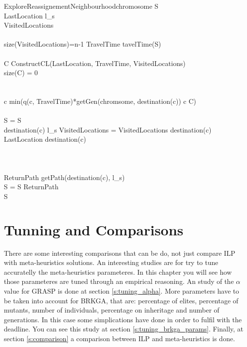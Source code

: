 \documentclass[]{report}
\begin{document}
\begin{pseudocode}{ExploreReassignementNeighbourhood}{chromosome}
	\label{pc:brkga_decoder}
	S \GETS \varnothing\\
	LastLocation \GETS l_{s}\\
	VisitedLocations \GETS \varnothing\\
	\\
	\WHILE \NOT size(VisitedLocations)=n-1 \DO
	\BEGIN
	TravelTime \GETS tavelTime(S)\\
	\\
	C \GETS ConstructCL(LastLocation, TravelTime, VisitedLocations)\\
	\IF size(C) = 0 \THEN
	\\
	\\
	\\
	c \GETS min(q(c, TravelTime)*getGen(chromsome, destination(c)) \quad \forall c \in C)\\
	\\
	S = S \\
	\IF destination(c) \neq l_{s} \THEN
	VisitedLocations = VisitedLocations \cup destination(c)\\
	LastLocation \GETS destination(c)\\
	\END\\
	\\
	\\
	ReturnPath \GETS getPath(destination(c), l_{s})\\
	S = S \cup ReturnPath\\
	
	\RETURN S
\end{pseudocode}

\chapter{Tunning and Comparisons}\label{ch:comparison}

There are some interesting comparisons that can be do, not just compare ILP with meta-heuristics solutions. An interesting studies are for try to tune accuratelly the meta-heuristics parameteres. In this chapter you will see how those parameteres are tuned through an empirical reasoning. An study of the $\alpha$ value for GRASP is done at section \ref{s:tuning_alpha}. More parameters have to be taken into account for BRKGA, that are: percentage of elites, percentage of mutants, number of individuals, percentage on inheritage and number of generations. In this case some simplications have done in order to fulfil with the deadline. You can see this study at section \ref{s:tuning_brkga_params}. Finally, at section \ref{s:comparison} a comparison between ILP and meta-heuristics is done.
\end{document}
